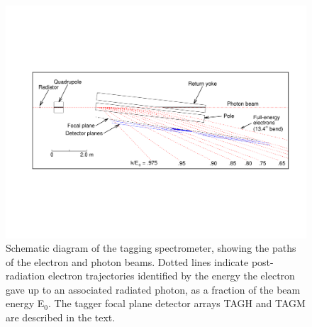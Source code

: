 \begin{figure}[tbp]
\begin{center}
   \includegraphics[width=0.95\linewidth,viewport=80 200 750 400]{figures/BEAM_taggerplot.pdf}
\caption{Schematic diagram of the tagging spectrometer, showing the paths of the electron
and photon beams. Dotted lines indicate post-radiation electron trajectories identified by
the energy the electron gave up to an associated radiated photon, as a fraction of the beam energy E$_0$.
The tagger focal plane detector arrays TAGH and TAGM are described in the text.
       \label{fig:beam:BEAM_taggerplot}  }
\end{center}
\end{figure}

